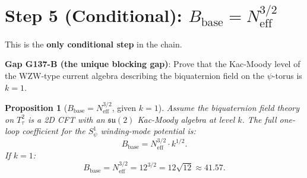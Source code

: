 \documentclass[12pt,a4paper]{article}
\newtheorem{proposition}[theorem]{Proposition}
\theoremstyle{definition}
\theoremstyle{remark}
\begin{document}
\section{Step 5 (Conditional): $B_{\mathrm{base}} = N_{\mathrm{eff}}^{3/2}$}
\label{sec:ar:Bbase}

This is the \textbf{only conditional step} in the chain.

\begin{gapbox}
\textbf{Gap G137-B (the unique blocking gap)}: Prove that the Kac-Moody level of
the WZW-type current algebra describing the biquaternion field on the
$\psi$-torus is $k = 1$.
\end{gapbox}

\begin{proposition}[$B_{\mathrm{base}} = N_{\mathrm{eff}}^{3/2}$, given $k = 1$]
\label{prop:ar:Bbase}
Assume the biquaternion field theory on $T^2_\tau$ is a 2D CFT with an
$\mathfrak{su}(2)$ Kac-Moody algebra at level $k$.  The full one-loop coefficient
for the $S^1_\psi$ winding-mode potential is:
\begin{equation}
  B_{\mathrm{base}} = N_{\mathrm{eff}}^{3/2} \cdot k^{1/2}.
  \label{eq:ar:Bbase_formula}
\end{equation}
If $k = 1$:
\begin{equation}
  B_{\mathrm{base}} = N_{\mathrm{eff}}^{3/2} = 12^{3/2} = 12\sqrt{12} \approx 41.57.
  \label{eq:ar:Bbase_k1}
\end{equation}
\end{proposition}
\end{document}
